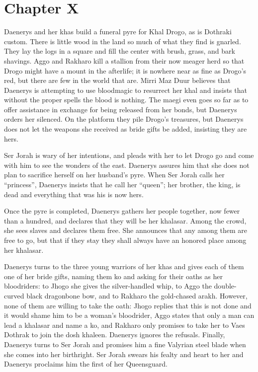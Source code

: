 \chapter*{\centering Chapter X}
\thispagestyle{fancy}
Daenerys and her khas build a funeral pyre for Khal Drogo, as is Dothraki custom. There is little wood in the land so much of what they find is gnarled. They lay the logs in a square and fill the center with brush, grass, and bark shavings. Aggo and Rakharo kill a stallion from their now meager herd so that Drogo might have a mount in the afterlife; it is nowhere near as fine as Drogo’s red, but there are few in the world that are. Mirri Maz Duur believes that Daenerys is attempting to use bloodmagic to resurrect her khal and insists that without the proper spells the blood is nothing. The maegi even goes so far as to offer assistance in exchange for being released from her bonds, but Daenerys orders her silenced. On the platform they pile Drogo's treasures, but Daenerys does not let the weapons she received as bride gifts be added, insisting they are hers.

Ser Jorah is wary of her intentions, and pleads with her to let Drogo go and come with him to see the wonders of the east. Daenerys assures him that she does not plan to sacrifice herself on her husband’s pyre. When Ser Jorah calls her “princess”, Daenerys insists that he call her “queen”; her brother, the king, is dead and everything that was his is now hers.

Once the pyre is completed, Daenerys gathers her people together, now fewer than a hundred, and declares that they will be her khalasar. Among the crowd, she sees slaves and declares them free. She announces that any among them are free to go, but that if they stay they shall always have an honored place among her khalasar.

Daenerys turns to the three young warriors of her khas and gives each of them one of her bride gifts, naming them ko and asking for their oaths as her bloodriders: to Jhogo she gives the silver-handled whip, to Aggo the double-curved black dragonbone bow, and to Rakharo the gold-chased arakh. However, none of them are willing to take the oath: Jhogo replies that this is not done and it would shame him to be a woman's bloodrider, Aggo states that only a man can lead a khalasar and name a ko, and Rakharo only promises to take her to Vaes Dothrak to join the dosh khaleen. Daenerys ignores the refusals. Finally, Daenerys turns to Ser Jorah and promises him a fine Valyrian steel blade when she comes into her birthright. Ser Jorah swears his fealty and heart to her and Daenerys proclaims him the first of her Queensguard.


